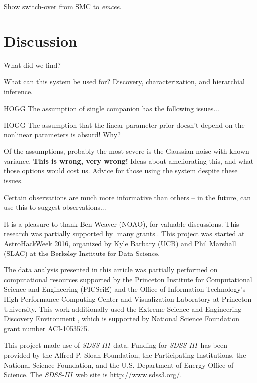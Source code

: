 \documentclass[manuscript, letterpaper]{aastex6}
\newcommand{\project}[1]{\textsl{#1}}
\newcommand{\acronym}[1]{{\small{#1}}}
\newcommand{\sdssiii}{\project{\acronym{SDSS-III}}}
\newcommand{\emcee}{\project{emcee}}
\begin{document}
Show switch-over from SMC to \emcee.

\section{Discussion} \label{sec:discussion}

What did we find?

What can this system be used for? Discovery, characterization, and
hierarchial inference.

HOGG The assumption of single companion has the following issues...

HOGG The assumption that the linear-parameter prior doesn't depend
on the nonlinear parameters is absurd! Why?

Of the assumptions, probably the most severe is the Gaussian noise
with known variance. \textbf{This is wrong, very wrong!} Ideas about
ameliorating this, and what those options would cost us. Advice for
those using the system despite these issues.

Certain observations are much more informative than others -- in the future,
can use this to suggest observations...

\acknowledgements
It is a pleasure to thank
  Ben Weaver (NOAO),
for valuable discussions.
This research was partially supported by [many grants].
This project was started at AstroHackWeek 2016, organized by Kyle
Barbary (UCB) and Phil Marshall (SLAC) at the Berkeley Institute for
Data Science.

The data analysis presented in this article was partially performed on
computational resources supported by the Princeton Institute for Computational
Science and Engineering (PICSciE) and the Office of Information Technology's
High Performance Computing Center and Visualization Laboratory at Princeton
University.
This work additionally used the Extreme Science and Engineering Discovery
Environment \citep[XSEDE;][]{Towns:2014}, which is supported by National
Science Foundation grant number ACI-1053575.

This project made use of \sdssiii\ data. Funding for \sdssiii\ has been
provided by the Alfred P. Sloan Foundation, the Participating Institutions, the
National Science Foundation, and the \acronym{U.S.} Department of Energy Office
of Science. The \sdssiii\ web site is \url{http://www.sdss3.org/}.
\end{document}
